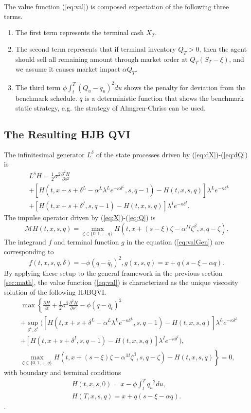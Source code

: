 \documentclass[12pt]{article}
\begin{document}
The value function (\ref{eq:val}) is composed expectation of the following three terms.
\begin{enumerate}
  \item The first term represents the terminal cash $X_T$.
  \item The second term represents that if terminal inventory $Q_T > 0$, then the agent should sell all remaining amount through market order at $Q_T(S_T-\xi)$, and we assume it causes market impact $\alpha Q_T$.
  \item The third term $\phi \int_t^T (Q_u-\bar{q}_u)^2du$ shows the penalty for deviation from the benchmark schedule. $\bar{q}$ is a deterministic function that shows the benchmark static strategy, e.g. the strategy of Almgren-Chriss \cite{almgren2001optimal} can be used.
\end{enumerate}

\subsection{The Resulting HJB QVI}
The infinitesimal generator $L^{\delta}$ of the state processes driven by (\ref{eq:dX})-(\ref{eq:dQ}) is
\begin{align*}
   &L^{\delta} H = \frac{1}{2}\sigma^2\frac{\partial^2H}{\partial s^2} \\
  &+ [H(t, x+ s+\delta^L-\alpha^L\lambda^L e^{-\kappa \delta^L} , s, q -1) - H(t, x, s, q)]\lambda^L e^{-\kappa \delta^L} \\
  &+[H(t, x+ s+\delta^I, s, q-1 ) - H(t, x, s, q)]\lambda^I e^{-\kappa \delta^I} .
\end{align*}
The impulse operator driven by (\ref{eq:X})-(\ref{eq:Q}) is
$$\mathcal{M}H(t,x,s, q) = \max_{\zeta\in \{0, 1, \cdots, q\}} H(t,x + (s-\xi)\zeta-\alpha^M\zeta^{\beta},s, q-\zeta). $$
The integrand $f$ and terminal function $g$ in the equation (\ref{eq:valGen}) are corresponding to
$$f(t, x,s,q,\delta) = -\phi  (q-\bar{q}_t)^2, g(x, s, q) = x + q(s-\xi-\alpha q).$$
By applying these setup to the general framework in the previous section \ref{sec:math}, 
the value function (\ref{eq:val}) is characterized as the unique viscosity solution of the following HJBQVI.
\begin{align} \label{eq:HJBQVI2}
    &\max\left\{\frac{\partial H}{\partial t} + \frac{1}{2}\sigma^2\frac{\partial^2H}{\partial s^2} - \phi  (q-\bar{q}_t)^2\right.\nonumber\\
    &\left. + \sup_{\delta^L, \delta^I}([H(t, x+ s+\delta^L-\alpha^L\lambda^L e^{-\kappa \delta^L} , s, q -1) - H(t, x, s, q)]\lambda^L e^{-\kappa \delta^L} \right. \nonumber\\
    &\left. + [H(t, x+ s+\delta^I, s, q-1 ) - H(t, x, s, q)]\lambda^I e^{-\kappa \delta^I} ), \right. \nonumber\\
    &\left.  \max_{\zeta\in \{0, 1, \cdots, q\}} H(t,x+(s-\xi)\zeta-\alpha^M\zeta^{\beta},s, q-\zeta) - H(t,x,s,q)\right\}  = 0, 
\end{align}
with boundary and terminal conditions
\begin{align*}
  H(t,x,s,0) = x -\phi \int_t^T \bar{q_u}^2 du,\\
  H(T,x,s,q) = x + q(s - \xi - \alpha q).
\end{align*}.
\end{document}
